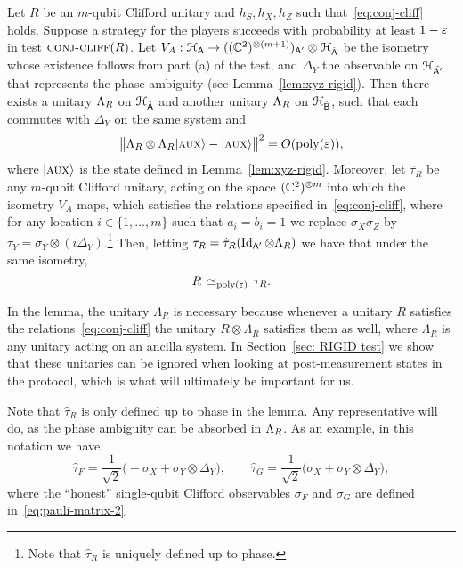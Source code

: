 \begin{lemma}\label{lem:cliff-conj}
Let $R$ be an $m$-qubit Clifford unitary and $h_S,h_X,h_Z$ such that~\eqref{eq:conj-cliff} holds. Suppose a strategy for the players succeeds with probability at least $1-\varepsilon$ in test $\textsc{conj-cliff}(R)$. Let $V_A:\mathcal{H}_{\textsf{A}} \to ((\mathbb{C}^2)^{\otimes (m+1)})_{{\textsf{A}}'}  \otimes {\mathcal{H}}_{\hat{{\textsf{A}}}}$ be the isometry whose existence follows from part (a) of the test, and $\Delta_Y$ the observable on $\mathcal{H}_{\hat{{\textsf{A}}'}}$ that represents the phase ambiguity (see Lemma~\ref{lem:xyz-rigid}). 
Then there exists a unitary $\Lambda_R$ on ${\mathcal{H}}_{\hat{{\textsf{A}}}}$ and another unitary $\Lambda_R$ on ${\mathcal{H}}_{\hat{{\textsf{B}}}}$, such that each commutes with $\Delta_Y$ on the same system and
\begin{equation}\label{eq:r-stab}
 \big\|\Lambda_R \otimes \Lambda_R |\textsc {aux}\rangle - |\textsc {aux}\rangle \big\|^2 = O(\operatorname{poly}(\varepsilon)),
\end{equation}
where $|\textsc {aux}\rangle$ is the state defined in Lemma~\ref{lem:xyz-rigid}.
Moreover, let $\hat{\tau}_R$ be any $m$-qubit Clifford unitary, acting on the space $(\mathbb{C}^2)^{\otimes m}$ into which the isometry $V_A$ maps, which satisfies the relations specified in~\eqref{eq:conj-cliff}, where for any location $i\in\{1,\ldots,m\}$ such that $a_i=b_i=1$ we replace $\sigma_X\sigma_Z$ by $\tau_Y = \sigma_Y \otimes (i\Delta_Y)$.\footnote{Note that $\hat{\tau}_R$ is uniquely defined up to phase.} Then, letting  $ \tau_R = \hat{\tau}_{R}(\mathop{\rm Id}\nolimits_{{\textsf{A}}'} \otimes \Lambda_R)$ we have that  under the same isometry,
$$R \,\simeq_{\operatorname{poly}(\varepsilon)}\, \tau_R.$$
\end{lemma}

In the lemma, the unitary $\Lambda_R$ is necessary because whenever a unitary $R$ satisfies the relations~\eqref{eq:conj-cliff} the unitary $R\otimes \Lambda_R$ satisfies them as well, where $\Lambda_R$ is any unitary acting on an ancilla system. In Section~\ref{sec: RIGID test} we show that these unitaries can be ignored when looking at post-measurement states in the protocol, which is what will ultimately be important for us.  

Note that $\hat{\tau}_R$ is only defined up to phase in the lemma. Any representative will do, as  the phase ambiguity can be absorbed in $\Lambda_R$. As an example, in this notation we have 
\begin{equation}\label{eq:hat-tau-def}
\hat{\tau}_F = \frac{1}{\sqrt{2}}\big(-\sigma_X + \sigma_Y \otimes \Delta_Y\big),\qquad \hat{\tau}_G = \frac{1}{\sqrt{2}}\big(\sigma_X + \sigma_Y \otimes \Delta_Y\big),
\end{equation}
where the ``honest'' single-qubit Clifford observables $\sigma_F$ and $\sigma_G$ are defined in~\eqref{eq:pauli-matrix-2}.

